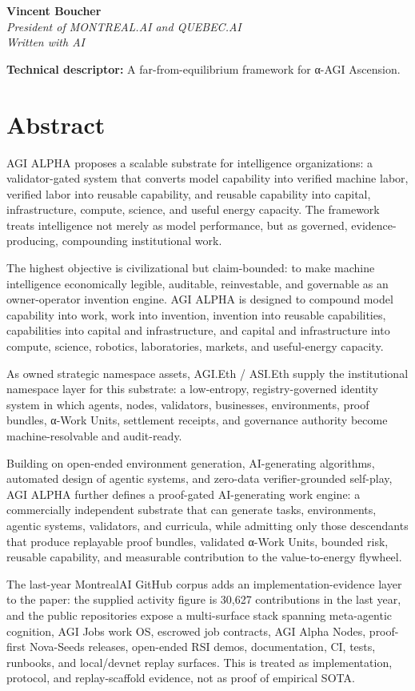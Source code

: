 \textbf{Vincent Boucher}\\
\emph{President of MONTREAL.AI and QUEBEC.AI}\\
\emph{Written with AI}

\textbf{Technical descriptor:} A far-from-equilibrium framework for
α-AGI Ascension.

\section{Abstract}\label{abstract}

AGI ALPHA proposes a scalable substrate for intelligence organizations:
a validator-gated system that converts model capability into verified
machine labor, verified labor into reusable capability, and reusable
capability into capital, infrastructure, compute, science, and useful
energy capacity. The framework treats intelligence not merely as model
performance, but as governed, evidence-producing, compounding
institutional work.

The highest objective is civilizational but claim-bounded: to make
machine intelligence economically legible, auditable, reinvestable, and
governable as an owner-operator invention engine. AGI ALPHA is designed
to compound model capability into work, work into invention, invention
into reusable capabilities, capabilities into capital and
infrastructure, and capital and infrastructure into compute, science,
robotics, laboratories, markets, and useful-energy capacity.

As owned strategic namespace assets, AGI.Eth / ASI.Eth supply the
institutional namespace layer for this substrate: a low-entropy,
registry-governed identity system in which agents, nodes, validators,
businesses, environments, proof bundles, α-Work Units, settlement
receipts, and governance authority become machine-resolvable and
audit-ready.

Building on open-ended environment generation, AI-generating algorithms,
automated design of agentic systems, and zero-data verifier-grounded
self-play, AGI ALPHA further defines a proof-gated AI-generating work
engine: a commercially independent substrate that can generate tasks,
environments, agentic systems, validators, and curricula, while
admitting only those descendants that produce replayable proof bundles,
validated α-Work Units, bounded risk, reusable capability, and
measurable contribution to the value-to-energy flywheel.

The last-year MontrealAI GitHub corpus adds an implementation-evidence
layer to the paper: the supplied activity figure is 30,627 contributions
in the last year, and the public repositories expose a multi-surface
stack spanning meta-agentic cognition, AGI Jobs work OS, escrowed job
contracts, AGI Alpha Nodes, proof-first Nova-Seeds releases, open-ended
RSI demos, documentation, CI, tests, runbooks, and local/devnet replay
surfaces. This is treated as implementation, protocol, and
replay-scaffold evidence, not as proof of empirical SOTA.

